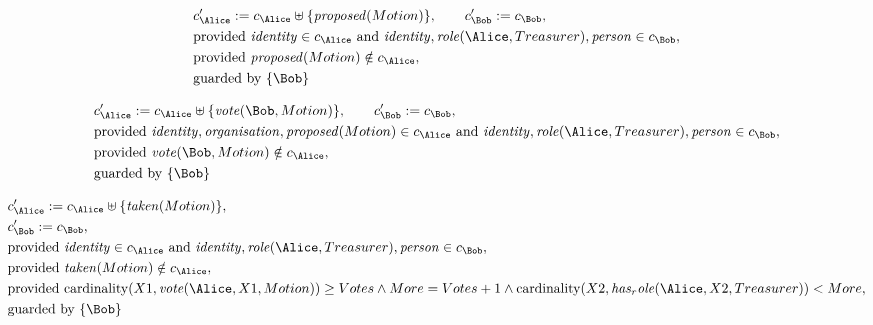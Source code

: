 \begin{align*}
&
c'_
{
\Alice
}
 := 
c_
{
\Alice
}
 \uplus 
\{
\mathit{
proposed
}
(
Motion
)
\}
, \qquad 
c'_
{
\Bob
}
 := 
c_
{
\Bob
}
,\\
&
\text{provided } 
\mathit{
identity
}
 \in c_
{
\Alice
}
 \text{ and } 
\mathit{
identity
}
,
\mathit{
role
}
(
\Alice
,
Treasurer
)
,
\mathit{
person
}
 \in c_
{
\Bob
}
,\\
&
\text{provided } 
\mathit{
proposed
}
(
Motion
)
 \notin c_
{
\Alice
}
,\\
&
\text{guarded by } \{
\Bob
\}
\end{align*}

\begin{align*}
&
c'_
{
\Alice
}
 := 
c_
{
\Alice
}
 \uplus 
\{
\mathit{
vote
}
(
\Bob
,
Motion
)
\}
, \qquad 
c'_
{
\Bob
}
 := 
c_
{
\Bob
}
,\\
&
\text{provided } 
\mathit{
identity
}
,
\mathit{
organisation
}
,
\mathit{
proposed
}
(
Motion
)
 \in c_
{
\Alice
}
 \text{ and } 
\mathit{
identity
}
,
\mathit{
role
}
(
\Alice
,
Treasurer
)
,
\mathit{
person
}
 \in c_
{
\Bob
}
,\\
&
\text{provided } 
\mathit{
vote
}
(
\Bob
,
Motion
)
 \notin c_
{
\Alice
}
,\\
&
\text{guarded by } \{
\Bob
\}
\end{align*}

\begin{align*}
&
c'_
{
\Alice
}
 := 
c_
{
\Alice
}
 \uplus 
\{
\mathit{
taken
}
(
Motion
)
\}
,\\
&
c'_
{
\Bob
}
 := 
c_
{
\Bob
}
,\\
&
\text{provided } 
\mathit{
identity
}
 \in c_
{
\Alice
}
 \text{ and } 
\mathit{
identity
}
,
\mathit{
role
}
(
\Alice
,
Treasurer
)
,
\mathit{
person
}
 \in c_
{
\Bob
}
,\\
&
\text{provided } 
\mathit{
taken
}
(
Motion
)
 \notin c_
{
\Alice
}
,\\
&
\text{provided } 
\mathrm{cardinality}(
X1
,
\mathit{
vote
}
(
\Alice
,
X1
,
Motion
)
)
\ge
Votes
\land
More
=
Votes
+
1
\land
\mathrm{cardinality}(
X2
,
\mathit{
has_role
}
(
\Alice
,
X2
,
Treasurer
)
)
<
More
,\\
&
\text{guarded by } \{
\Bob
\}
\end{align*}

